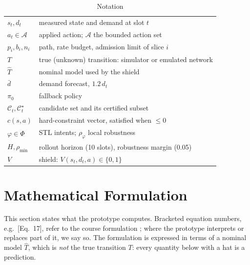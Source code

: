 \documentclass[conference]{IEEEtran}
\newcommand{\That}{\hat{T}}
\newcommand{\dbar}{\bar{d}}
\newcommand{\Acal}{\mathcal{A}}
\newcommand{\Ccal}{\mathcal{C}}
\newcommand{\rhomin}{\rho_{\min}}
\begin{document}
\begin{table}[t]
\caption{Notation}
\label{tab:notation}
\centering
\footnotesize
\begin{tabular}{@{}lp{6.1cm}@{}}
\toprule
$s_t, d_t$ & measured state and demand at slot $t$ \\
$a_t \in \Acal$ & applied action; $\Acal$ the bounded action set \\
$p_i, b_i, n_i$ & path, rate budget, admission limit of slice $i$ \\
$T$ & true (unknown) transition: simulator or emulated network \\
$\That$ & nominal model used by the shield \\
$\dbar$ & demand forecast, $1.2\,d_t$ \\
$\pi_0$ & fallback policy \\
$\Ccal_t, \Ccal^\star_t$ & candidate set and its certified subset \\
$c(s,a)$ & hard-constraint vector, satisfied when $\le 0$ \\
$\varphi \in \Phi$ & STL intents; $\rho_\varphi$ local robustness \\
$H, \rhomin$ & rollout horizon (10 slots), robustness margin (0.05) \\
$V$ & shield: $V(s_t,d_t,a)\in\{0,1\}$ \\
\bottomrule
\end{tabular}
\end{table}

\section{Mathematical Formulation}
\label{sec:formulation}

This section states what the prototype computes. Bracketed equation numbers, e.g.\
[Eq.~17], refer to the course formulation \cite{vgcp_formulation}; where the
prototype interprets or replaces part of it, we say so. The formulation is
expressed in terms of a nominal model $\That$, which is \emph{not} the true
transition $T$: every quantity below with a hat is a prediction.
\end{document}
